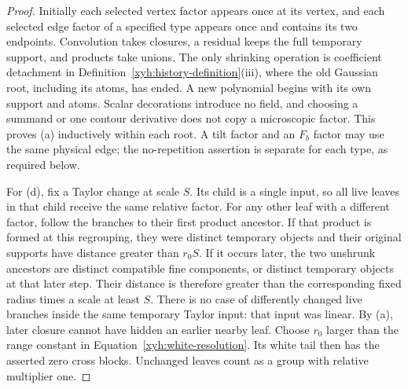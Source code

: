 \begin{proof}
Initially each selected vertex factor appears once at its vertex, and each
selected edge factor of a specified type appears once and contains its two
endpoints. Convolution takes closures, a residual keeps
the full temporary support, and products take unions. The only shrinking
operation is coefficient detachment in Definition~\ref{xyh:history-definition}(iii),
where the old Gaussian root, including its atoms, has ended. A new
polynomial begins with its own support and atoms. Scalar decorations
introduce no field, and choosing a summand or one contour derivative does
not copy a microscopic factor. This proves (a) inductively within each
root. A tilt factor and an
$F_b$ factor may use the same physical edge; the no-repetition assertion
is separate for each type, as required below.

For (d), fix a Taylor change at scale $S$. Its child is a single input, so
all live leaves in that child receive the same relative factor. For any
other leaf with a different factor, follow the branches to their first
product ancestor. If that product is formed at this regrouping, they
were distinct temporary objects and their original supports have
distance greater than $r_0S$. If it occurs later, the two unshrunk
ancestors are distinct compatible fine components, or distinct temporary
objects at that later step. Their distance is therefore greater than
the corresponding fixed radius times a scale at least $S$. There is no
case of differently changed live branches inside the same temporary
Taylor input: that input was linear. By (a), later closure cannot have
hidden an earlier nearby leaf. Choose $r_0$ larger than the range constant
in Equation~\eqref{xyh:white-resolution}. Its white tail then has the
asserted zero cross blocks. Unchanged leaves count as a group with
relative multiplier one.


\end{proof}
